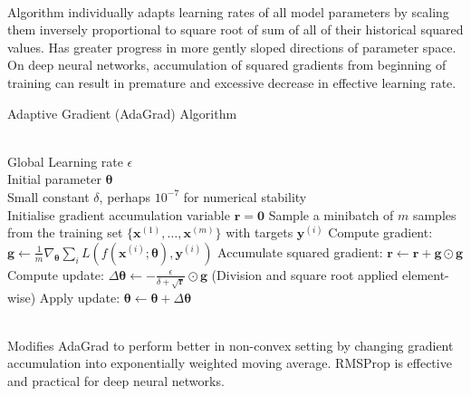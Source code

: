 \begin{remark} \\
Algorithm individually adapts learning rates of all model parameters by scaling them inversely proportional to square root of sum of all of their historical squared values. Has greater progress in more gently sloped directions of parameter space. On deep neural networks, accumulation of squared gradients from beginning of training can result in premature and excessive decrease in effective learning rate.
\end{remark}

\begin{breakablealgorithm}
\caption{Adaptive Gradient (AdaGrad) Algorithm}
\begin{algorithmic}
\Require \\
Global Learning rate $\epsilon$\\
Initial parameter $\bm{\theta}$\\
Small constant $\delta$, perhaps $10^{-7}$ for numerical stability\\

\State Initialise gradient accumulation variable $\bm{r} = \bm{0}$
\State Sample a minibatch of $m$ samples from the training set $\{\bm{x}^{(1)}, \ldots, \bm{x}^{(m)} \}$ with targets $\bm{y}^{(i)}$
\State Compute gradient: $\bm{g} \leftarrow \frac{1}{m} \nabla_{\bm{\theta}} \sum_i L(f(\bm{x}^{(i)}; \bm{\theta}), \bm{y}^{(i)})$
\State Accumulate squared gradient: $\bm{r} \leftarrow \bm{r} + \bm{g} \odot \bm{g}$
\State Compute update: $\Delta \bm{\theta} \leftarrow - \frac{\epsilon}{\delta + \sqrt{\bm{r}}} \odot \bm{g}$ (Division and square root applied element-wise)
\State Apply update: $\bm{\theta} \leftarrow \bm{\theta} + \Delta \bm{\theta}$
\EndWhile
\end{algorithmic}
\end{breakablealgorithm}

\begin{remark} \\
Modifies AdaGrad to perform better in non-convex setting by changing gradient accumulation into exponentially weighted moving average. RMSProp is effective and practical for deep neural networks.
\end{remark}

